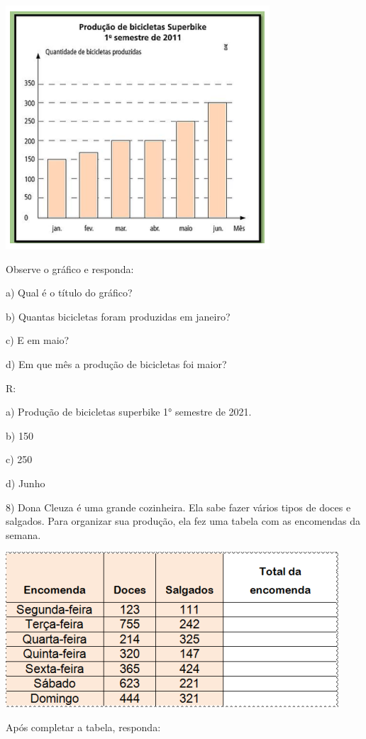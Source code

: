 \includegraphics[width=3.875in,height=3.57292in]{./imgSAEB_6_MAT/media/image85.png}

Observe o gráfico e responda:

a) Qual é o título do gráfico?

b) Quantas bicicletas foram produzidas em janeiro?

c) E em maio?

d) Em que mês a produção de bicicletas foi maior?

R:

a) Produção de bicicletas superbike 1° semestre de 2021.

b) 150

c) 250

d) Junho

8) Dona Cleuza é uma grande cozinheira. Ela sabe fazer vários tipos de
doces e salgados. Para organizar sua produção, ela fez uma tabela com as
encomendas da semana.

\includegraphics[width=4.88403in,height=2.27917in]{./imgSAEB_6_MAT/media/image86.png}

Após completar a tabela, responda:


